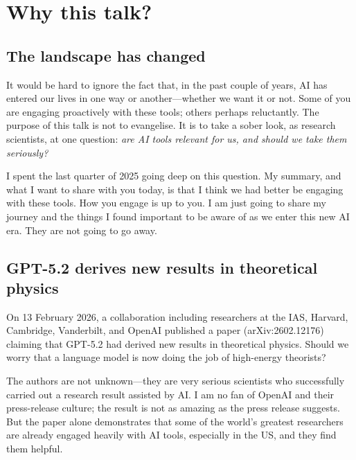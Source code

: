 
\section{Why this talk?}\label{sec:why}

\subsection{The landscape has changed}

It would be hard to ignore the fact that, in the past couple of years, AI
has entered our lives in one way or another---whether we want it or not.
Some of you are engaging proactively with these tools; others perhaps
reluctantly.  The purpose of this talk is not to evangelise.  It is to
take a sober look, as research scientists, at one question: \emph{are AI
tools relevant for us, and should we take them seriously?}

I spent the last quarter of 2025 going deep on this question.  My
summary, and what I want to share with you today, is that I think we had
better be engaging with these tools.  How you engage is up to you.  I am
just going to share my journey and the things I found important to be
aware of as we enter this new AI era.  They are not going to go away.

\subsection{GPT-5.2 derives new results in theoretical physics}

On 13 February 2026, a collaboration including researchers at the IAS,
Harvard, Cambridge, Vanderbilt, and OpenAI published a paper
(arXiv:2602.12176) claiming that GPT-5.2 had derived new results in
theoretical physics.  Should we worry that a language model is now doing
the job of high-energy theorists?

The authors are not unknown---they are very serious scientists who
successfully carried out a research result assisted by AI\@.  I am no fan
of OpenAI and their press-release culture; the result is not as amazing
as the press release suggests.  But the paper alone demonstrates that
some of the world's greatest researchers are already engaged heavily with
AI tools, especially in the US, and they find them helpful.

